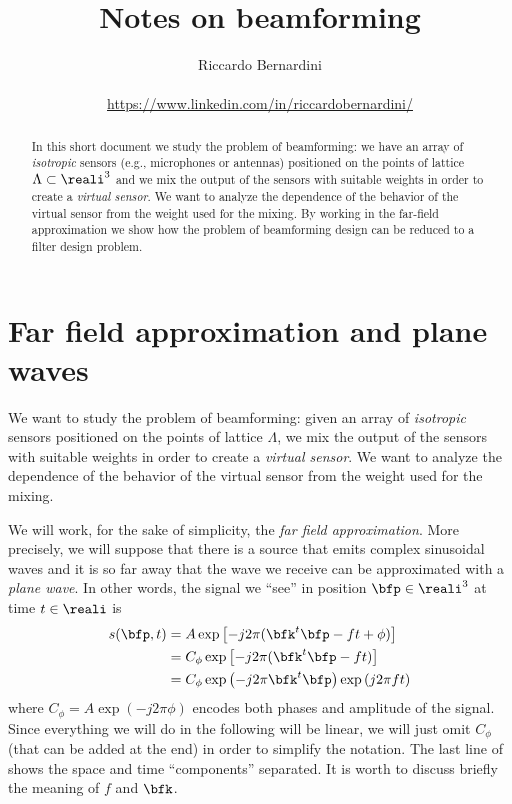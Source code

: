 \documentclass[11pt]{article}
\title{Notes on beamforming}
\author{Riccardo Bernardini\\\email{riccardo.bernardini@uniud.it}
\\  \url{https://www.linkedin.com/in/riccardobernardini/}}
\newcommand{\wv}{\bfk}
\newcommand{\x}[1][0]{\ifcase #1\bfp \or\bfq\else x#1\fi}
\newcommand{\sig}[1][\x,t]{s({#1})}
\begin{document}
\maketitle
\begin{abstract}
In this short document we study the problem of beamforming: we have an
array of \emph{isotropic} sensors (e.g., microphones or antennas)
positioned on the points of lattice $\Lambda \subset \reali^3$ and we
mix the output of the sensors with suitable weights in order to create
a \emph{virtual sensor}.  We want to analyze the dependence of the
behavior of the virtual sensor from the weight used for the mixing.
By working in the far-field approximation we show how the problem of
beamforming design can be reduced to a filter design problem.
\end{abstract}

\tableofcontents




\section{Far field approximation and plane waves}
\label{sect:0;beamforming-notes}

We want to study the problem of beamforming: given an array of
\emph{isotropic} sensors positioned on the points of lattice
$\Lambda$, we mix the output of the sensors with suitable weights in
order to create a \emph{virtual sensor}.  We want to analyze the
dependence of the behavior of the virtual sensor from the weight used
for the mixing.

We will work, for the sake of simplicity, the \emph{far field
  approximation}.  More precisely, we will suppose that there is a
source that emits complex sinusoidal waves and it is so far away that
the wave we receive can be approximated with a \emph{plane wave}. In
other words, the signal we ``see'' in position $\bfp \in\reali^3$ at
time $t \in \reali$ is
%
\begin{equation}
  \label{eq:1;beamforming-notes}
  \begin{split}
    \sig &=
    A \exp\left[-j 2\pi (\wv^t\x-ft + \phi) \right]\\
    &=C_\phi \exp\left[-j 2\pi (\wv^t\x-ft) \right]\\
    &=C_\phi \exp\left(-j 2\pi \wv^t\x \right)
    \exp\left(j 2\pi ft\right)\\
  \end{split}
\end{equation}
%
where $C_\phi = A \exp(-j2\pi \phi)$ encodes both phases and amplitude
of the signal.  Since everything we will do in the following will be
linear, we will just omit $C_\phi$ (that can be added at the end) in
order to simplify the notation.  The last line of
 shows the space and time ``components''
separated. It is worth to discuss briefly the meaning of $f$ and
$\wv$.
\end{document}
